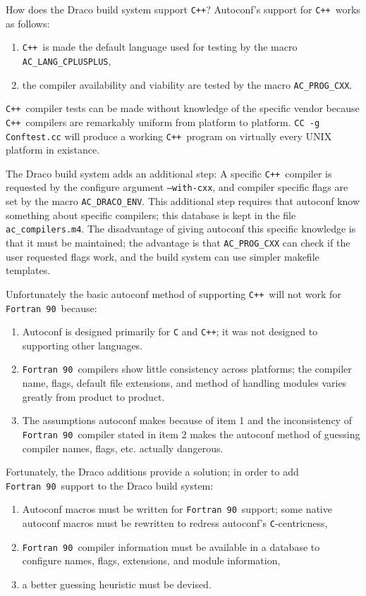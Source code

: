 \documentclass[11pt]{nmemo}
\newcommand{\fninety}{\texttt{Fortran~90}}
\newcommand{\cpp}{\texttt{C++}}
\begin{document}
How does the Draco build system support \cpp?  Autoconf's support for
\cpp\ works as follows:
\begin{enumerate} 
\item \cpp\ is made the default language used for testing by the macro
\texttt{AC\_LANG\_CPLUSPLUS},
\item the compiler availability and viability are tested by
the macro \texttt{AC\_PROG\_CXX}.
\end{enumerate}
\cpp\ compiler tests can be made without knowledge of the specific
vendor because \cpp\ compilers are remarkably uniform from platform to
platform. \texttt{CC -g Conftest.cc} will produce a working \cpp\
program on virtually every UNIX platform in existance.

The Draco build system adds an additional step: A specific \cpp\
compiler is requested by the configure argument \texttt{--with-cxx},
and compiler specific flags are set by the macro
\texttt{AC\_DRACO\_ENV}.  This additional step requires that autoconf
know something about specific compilers; this database is kept in the
file \texttt{ac\_compilers.m4}.  The disadvantage of giving autoconf
this specific knowledge is that it must be maintained; the advantage
is that \texttt{AC\_PROG\_CXX} can check if the user requested flags
work, and the build system can use simpler makefile templates.

Unfortunately the basic autoconf method of supporting \cpp\ will not
work for \fninety\ because:
\begin{enumerate}
\item Autoconf is designed primarily for \texttt{C} and \cpp; it was
not designed to supporting other languages.
\item \fninety\ compilers show little consistency across platforms;
the compiler name, flags, default file extensions, and method of
handling modules varies greatly from product to product.
\item The assumptions autoconf makes because of item 1 and the
inconsistency of \fninety\ compiler stated in item 2 makes the
autoconf method of guessing compiler names, flags, etc. actually
dangerous.
\end{enumerate}

Fortunately, the Draco additions provide a solution; in order to add
\fninety\ support to the Draco build system: 
\begin{enumerate}
\item Autoconf macros must be written for \fninety\ support; some
native autoconf macros must be rewritten to redress autoconf's
\texttt{C}-centricness,  
\item \fninety\ compiler information must be available in a database
to configure names, flags, extensions, and module information,
\item a better guessing heuristic must be devised.
\end{enumerate}
\end{document}
